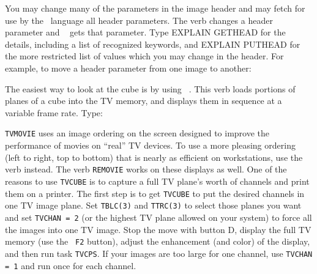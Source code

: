      You may change many of the parameters in the image header and may
fetch for use by the \POPS\ language all header parameters.  The
verb {\tt {}} changes a header parameter and {\tt
{}} gets that parameter.  Type {\us EXPLAIN GETHEAD \CR}
for the details, including a list of recognized keywords, and {\us
EXPLAIN PUTHEAD \CR} for the more restricted list of values which you
may change in the header.  For example, to move a header parameter
from one image to another:
\pd


     The easiest way to look at the cube is by using {\tt
{}}\@.  This verb loads portions of planes of a cube into
the TV memory, and displays them in sequence at a variable frame rate.
Type:

     {\tt TVMOVIE} uses an image ordering on the screen designed to
improve the performance of movies on ``real'' TV devices.  To use a
more pleasing ordering (left to right, top to bottom) that is nearly
as efficient on workstations, use the {\tt {}} verb
instead.  The verb {\tt REMOVIE} works on these displays as well.  One
of the reasons to use {\tt TVCUBE} is to capture a full TV plane's
worth of channels and print them on a  printer.  The
first step is to get {\tt TVCUBE} to put the desired channels in one
TV image plane. Set {\tt TBLC(3)} and {\tt TTRC(3)} to select those
planes you want and set {\tt TVCHAN = 2} (or the highest TV plane
allowed on your system) to force all the images into one TV image.
Stop the move with button D, display the full TV memory (use the {\tt
F2} button), adjust the enhancement (and color) of the display, and
then run task {\tt TVCPS}\@.  If your images are too large for
one channel, use {\tt TVCHAN = 1} and run {\tt {}} once for
each channel.


